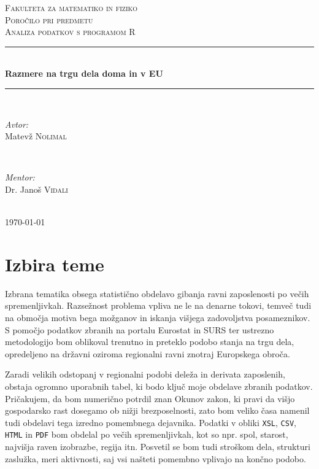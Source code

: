 \documentclass[11pt,a4paper]{article}
\begin{document}
\begin{titlepage}

\newcommand{\HRule}{\rule{\linewidth}{0.5mm}}

\center

\textsc{\LARGE Fakulteta za matematiko in fiziko}\\[1.5cm]
\textsc{\Large Poročilo pri predmetu}\\[0.5cm]
\textsc{\large Analiza podatkov s programom R}\\[0.5cm]
\HRule \\[0.4cm]
{ \huge \bfseries Razmere na trgu dela doma in v EU}\\[0.4cm] 
\HRule \\[1.5cm]


\begin{minipage}{0.4\textwidth}
\begin{flushleft} \large
\emph{Avtor:}\\
Matevž \textsc{Nolimal}
\end{flushleft}
\end{minipage}
~
\begin{minipage}{0.4\textwidth}
\begin{flushright} \large
\emph{Mentor:} \\
Dr. Janoš \textsc{Vidali}
\end{flushright}
\end{minipage}\\[4cm]

{\large \today}\\[3cm] 
\vfill

\end{titlepage}


\section{Izbira teme}

Izbrana tematika obsega statistično obdelavo gibanja ravni zaposlenosti po večih spremenljivkah. Razsežnost problema vpliva ne le na denarne tokovi, temveč tudi na območja motiva bega možganov in iskanja višjega zadovoljstva posameznikov. S pomočjo podatkov zbranih na portalu Eurostat in SURS ter ustrezno metodologijo bom oblikoval trenutno in preteklo podobo stanja na trgu dela, opredeljeno na državni oziroma regionalni ravni znotraj Europskega obroča.

Zaradi velikih odstopanj v regionalni podobi deleža in derivata zaposlenih, obstaja ogromno uporabnih tabel, ki bodo ključ moje obdelave zbranih podatkov. Pričakujem, da bom numerično potrdil znan Okunov zakon, ki pravi da višjo gospodarsko rast dosegamo ob nižji brezposelnosti, zato bom veliko časa namenil tudi obdelavi tega izredno pomembnega dejavnika. Podatki v obliki \verb|XSL|, \verb|CSV|, \verb|HTML| in \verb|PDF| bom obdelal po večih spremenljivkah, kot so npr. spol, starost, najvišja raven izobrazbe, regija itn. Posvetil se bom tudi stroškom dela, strukturi zaslužka, meri aktivnosti, saj vsi našteti pomembno vplivajo na končno podobo. 
\end{document}
